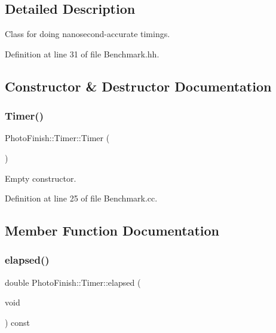 \subsection{Detailed Description}
Class for doing nanosecond-\/accurate timings. 

Definition at line 31 of file Benchmark.\+hh.



\subsection{Constructor \& Destructor Documentation}
\mbox{\label{class_photo_finish_1_1_timer_a29642b3310f111b0b1f3b7abe2d5c194}} 
\subsubsection{\texorpdfstring{Timer()}{Timer()}}
{\footnotesize\ttfamily Photo\+Finish\+::\+Timer\+::\+Timer (\begin{DoxyParamCaption}{ }\end{DoxyParamCaption})}



Empty constructor. 



Definition at line 25 of file Benchmark.\+cc.



\subsection{Member Function Documentation}
\mbox{\label{class_photo_finish_1_1_timer_a77d32536b682c7482a9374ef2d32ad3c}} 
\subsubsection{\texorpdfstring{elapsed()}{elapsed()}}
{\footnotesize\ttfamily double Photo\+Finish\+::\+Timer\+::elapsed (\begin{DoxyParamCaption}\item[{void}]{ }\end{DoxyParamCaption}) const}




